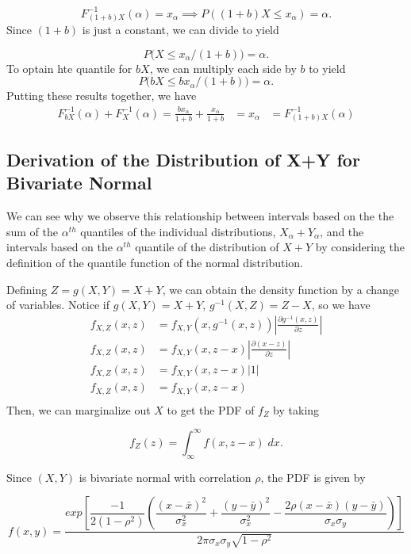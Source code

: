 \documentclass[12pt,twoside]{smiththesis}
\begin{document}
\[F^{-1}_{(1+b) X } (\alpha) = x_\alpha \implies P((1+b) X \leq x_\alpha) = \alpha.\]
Since \((1+b)\) is just a constant, we can divide to yield

\[P\Big( X \leq x_\alpha/(1+b) \Big) = \alpha.\]
To optain hte quantile for \(bX\), we can multiply each side by \(b\) to yield
\[P\Big( bX \leq bx_\alpha/(1+b) \Big) = \alpha.\]
Putting these results together, we have
\begin{align*}
F^{-1}_{bX} (\alpha) + F^{-1}_{X} (\alpha) = \frac{bx_\alpha } { 1+b} + \frac{x_\alpha}{1+b}
&= x_\alpha 
&= F^{-1}_{(1+b)X}(\alpha) \end{align*}

\hypertarget{conservativeintervals}{%
\subsection{Derivation of the Distribution of X+Y for Bivariate Normal}\label{conservativeintervals}}

We can see why we observe this relationship between intervals based on the the sum of the \(\alpha^{th}\) quantiles of the individual distributions, \(X_\alpha + Y_\alpha\), and the intervals based on the \(\alpha^{th}\) quantile of the distribution of \(X+Y\) by considering the definition of the quantile function of the normal distribution.

Defining \(Z=g(X,Y) = X+Y\), we can obtain the density function by a change of variables. Notice if \(g(X,Y) = X+Y\), \(g^{-1}(X,Z) = Z-X\), so we have
\begin{align*} f_{X,Z}(x,z) &= f_{X,Y}(x,g^{-1}(x,z)) \left|\frac{\partial g^{-1}(x,z)}{\partial z}\right| \\
f_{X,Z}(x,z) &= f_{X,Y}(x,z-x) \left|\frac{\partial (x-z)}{\partial z}\right|\\
f_{X,Z}(x,z) &= f_{X,Y}(x,z-x) \left|1\right|\\
f_{X,Z}(x,z) &= f_{X,Y}(x,z-x) \\
\end{align*}
Then, we can marginalize out \(X\) to get the PDF of \(f_Z\) by taking

\[f_Z(z) = \int_{\infty}^\infty f(x,z-x) \; dx.\]

Since \((X,Y)\) is bivariate normal with correlation \(\rho\), the PDF is given by

\[f(x,y) = \dfrac{exp\left[\dfrac{-1}{2(1-\rho^2)} \left( \dfrac{(x-\bar x)^2}{\sigma_x^2}+\dfrac{(y-\bar y)^2}{\sigma_x^2} - \dfrac{2 \rho (x-\bar x)(y-\bar y)}{\sigma_x\sigma_y} \right)\right]}{2\pi \sigma_x \sigma_y \sqrt{1- \rho^2}}\]
\end{document}
